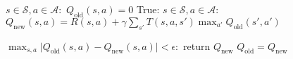 \documentclass[10pt,oneside]{book}
\begin{document}
\pagestyle{empty}
\thispagestyle{empty}

\begin{codebox}
  \li     \For $s \in \mathcal{S}, a \in \mathcal{A}:$
	\Do
  \li        $Q_{\text{old}}(s, a) = 0$
        \End
  \li     \While True:
        \Do
  \li        \For $s \in \mathcal{S}, a \in \mathcal{A}:$
           \Do
  \li           $Q_{\text{new}}(s, a) = R(s, a) + \gamma\sum_{s'}T(s, a, s')\max_{a'}Q_{\text{old}}(s', a')$
         \End

  \li      \If $\max_{s, a}\lvert Q_{\text{old}}(s, a) - Q_{\text{new}}(s, a)\rvert < \epsilon:$
         \Do
  \li           return $Q_{\text{new}}$
        \End
  \li      $Q_{\text{old}} = Q_{\text{new}}$
	\End
\end{codebox}
\end{document}
